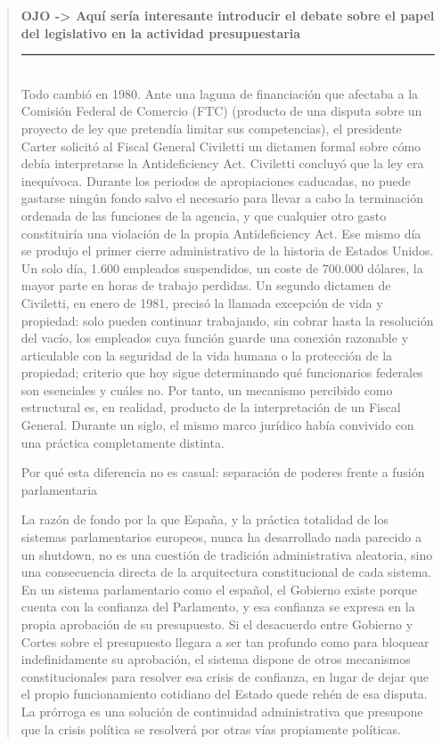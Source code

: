 \documentclass[10pt,a4paper]{article}
\newenvironment{specialblock}[1]{%
      \begin{quote} %
      \small %
      \noindent\textbf{#1}\\[-0.3em] %
      \rule{\linewidth}{0.4pt}\\[0.6em]}{
      \end{quote}}
\begin{document}
\begin{specialblock}{\textbf{OJO ->} Aquí sería interesante introducir el debate sobre el papel del legislativo en la actividad presupuestaria}
    Todo cambió en 1980. Ante una laguna de financiación que afectaba a la Comisión Federal de Comercio (FTC) (producto de una disputa sobre un proyecto de ley que pretendía limitar sus competencias), el presidente Carter solicitó al Fiscal General Civiletti un dictamen formal sobre cómo debía interpretarse la Antideficiency Act. Civiletti concluyó que la ley era inequívoca. Durante los periodos de apropiaciones caducadas, no puede gastarse ningún fondo salvo el necesario para llevar a cabo la terminación ordenada de las funciones de la agencia, y que cualquier otro gasto constituiría una violación de la propia Antideficiency Act. Ese mismo día se produjo el primer cierre administrativo de la historia de Estados Unidos. Un solo día, 1.600 empleados suspendidos, un coste de 700.000 dólares, la mayor parte en horas de trabajo perdidas. Un segundo dictamen de Civiletti, en enero de 1981, precisó la llamada excepción de vida y propiedad: solo pueden continuar trabajando, sin cobrar hasta la resolución del vacío, los empleados cuya función guarde una conexión razonable y articulable con la seguridad de la vida humana o la protección de la propiedad; criterio que hoy sigue determinando qué funcionarios federales son esenciales y cuáles no. Por tanto, un mecanismo percibido como estructural es, en realidad, producto de la interpretación de un Fiscal General. Durante un siglo, el mismo marco jurídico había convivido con una práctica completamente distinta.
    
    Por qué esta diferencia no es casual: separación de poderes frente a fusión parlamentaria
    
    La razón de fondo por la que España, y la práctica totalidad de los sistemas parlamentarios europeos, nunca ha desarrollado nada parecido a un shutdown, no es una cuestión de tradición administrativa aleatoria, sino una consecuencia directa de la arquitectura constitucional de cada sistema. En un sistema parlamentario como el español, el Gobierno existe porque cuenta con la confianza del Parlamento, y esa confianza se expresa en la propia aprobación de su presupuesto. Si el desacuerdo entre Gobierno y Cortes sobre el presupuesto llegara a ser tan profundo como para bloquear indefinidamente su aprobación, el sistema dispone de otros mecanismos constitucionales para resolver esa crisis de confianza, en lugar de dejar que el propio funcionamiento cotidiano del Estado quede rehén de esa disputa. La prórroga es una solución de continuidad administrativa que presupone que la crisis política se resolverá por otras vías propiamente políticas.
    

\end{specialblock}
\end{document}
